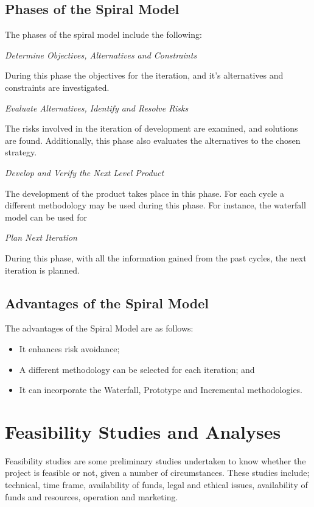 \subsection{Phases of the Spiral Model}
The phases of the spiral model include the following:

\textit{Determine Objectives, Alternatives and Constraints}

During this phase the objectives for the iteration, and it's alternatives and constraints are investigated.

\textit{Evaluate Alternatives, Identify and Resolve Risks}

The risks involved in the iteration of development are examined, and solutions are found. Additionally, this phase also evaluates the alternatives to the chosen strategy.

\textit{Develop and Verify the Next Level Product}

The development of the product takes place in this phase. For each cycle a different methodology may be used during this phase. For instance, the waterfall model can be used for 

\textit{Plan Next Iteration}

During this phase, with all the information gained from the past cycles, the next iteration is planned.

\subsection{Advantages of the Spiral Model}
The advantages of the Spiral Model are as follows:
\begin{itemize}
	\item It enhances risk avoidance;
	\item A different methodology can be selected for each iteration; and 
	\item It can incorporate the Waterfall, Prototype and Incremental methodologies.
\end{itemize}

\section{Feasibility Studies and Analyses}
Feasibility studies are some preliminary studies undertaken to know whether the project is feasible or not, given a number of circumstances. These studies include; technical, time frame, availability of funds, legal and ethical issues, availability of funds and resources, operation and marketing.

